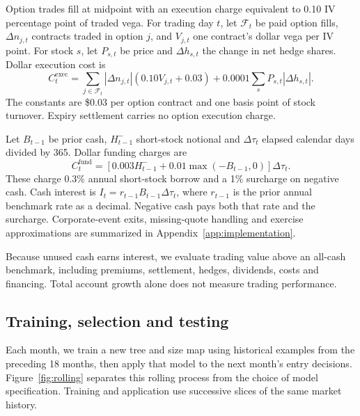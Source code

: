 \documentclass[11pt,letterpaper]{article}
\newcommand{\money}[1]{\$#1}
\begin{document}
Option trades fill at midpoint with an execution charge equivalent to 0.10 IV
percentage point of traded vega. For trading day $t$, let $\mathcal F_t$ be
paid option fills, $\Delta n_{j,t}$ contracts traded in option $j$, and
$V_{j,t}$ one contract's dollar vega per IV point. For stock $s$, let $P_{s,t}$
be price and $\Delta h_{s,t}$ the change in net hedge shares. Dollar execution
cost is
\[
C_t^{\mathrm{exec}}=\sum_{j\in\mathcal F_t}|\Delta n_{j,t}|
 (0.10V_{j,t}+0.03)+0.0001\sum_s P_{s,t}|\Delta h_{s,t}|.
\]
The constants are \money{0.03} per option contract and one basis point of
stock turnover. Expiry settlement carries no option execution charge.

Let $B_{t-1}$ be prior cash, $H^-_{t-1}$ short-stock notional and
$\Delta\tau_t$ elapsed calendar days divided by 365. Dollar funding charges are
\[
C_t^{\mathrm{fund}}=
 [0.003H^-_{t-1}+0.01\max(-B_{t-1},0)]\Delta\tau_t.
\]
These charge 0.3\% annual short-stock borrow and a 1\% surcharge on negative
cash. Cash interest is $I_t=r_{t-1}B_{t-1}\Delta\tau_t$, where $r_{t-1}$ is the
prior annual benchmark rate as a decimal. Negative cash pays both that rate
and the surcharge. Corporate-event exits, missing-quote handling and exercise
approximations are summarized in Appendix~\ref{app:implementation}.

Because unused cash earns interest, we evaluate trading value above an all-cash
benchmark, including premiums, settlement, hedges, dividends, costs and
financing. Total account growth alone does not measure trading performance.

\clearpage
\subsection{Training, selection and testing}
Each month, we train a new tree and size map using historical examples from
the preceding 18 months, then apply that model to the next month's entry
decisions. Figure~\ref{fig:rolling} separates this rolling process from the
choice of model specification. Training and application use successive slices
of the same market history.
\end{document}
